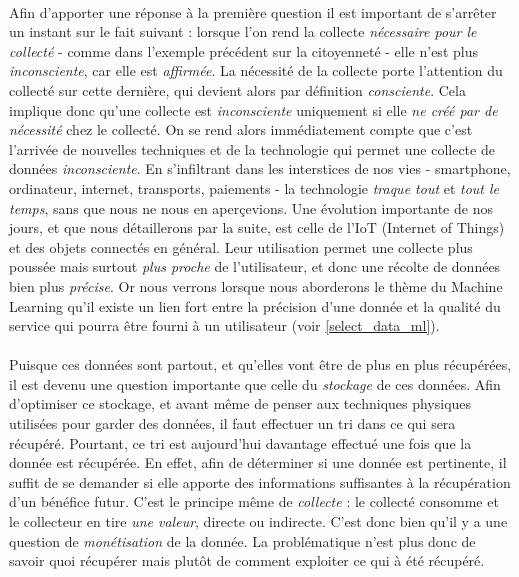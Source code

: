 \paragraph{} Afin d'apporter une réponse à la première question il est important de s'arrêter un instant sur le fait
suivant : lorsque l'on rend la collecte \emph{nécessaire pour le collecté} - comme dans l'exemple précédent sur la
citoyenneté - elle n'est plus \emph{inconsciente}, car elle est \emph{affirmée}. La nécessité de la collecte porte
l'attention du collecté sur cette dernière, qui devient alors par définition \emph{consciente}. Cela
implique donc qu'une collecte est \emph{inconsciente} uniquement si elle \emph{ne créé par de nécessité}
chez le collecté. On se rend alors immédiatement compte que c'est l'arrivée de nouvelles techniques et de la
technologie qui permet une collecte de données \emph{inconsciente}. En s'infiltrant dans les interstices de nos vies -
smartphone, ordinateur, internet, transports, paiements - la technologie \emph{traque tout} et \emph{tout le temps},
sans que nous ne nous en aperçevions. Une évolution importante de nos jours, et que nous détaillerons par la suite, est
celle de l'IoT (Internet of Things) et des objets connectés en général. Leur utilisation permet une collecte plus
poussée mais surtout \emph{plus proche} de l'utilisateur, et donc une récolte de données bien plus \emph{précise}. Or
nous verrons lorsque nous aborderons le thème du Machine Learning qu'il existe un lien fort entre la précision d'une
donnée et la qualité du service qui pourra être fourni à un utilisateur (voir \ref{select_data_ml}).

\paragraph{} Puisque ces données sont partout, et qu'elles vont être de plus en plus récupérées, il est devenu
une question importante que celle du \emph{stockage} de ces données. Afin d'optimiser ce stockage, et avant même de
penser aux techniques physiques utilisées pour garder des données, il faut effectuer un tri dans ce qui sera récupéré.
Pourtant, ce tri est aujourd'hui davantage effectué une fois que la donnée est récupérée. En effet, afin de déterminer
si une donnée est pertinente, il suffit de se demander si elle apporte des informations suffisantes à la récupération
d'un bénéfice futur. C'est le principe même de \emph{collecte} : le collecté consomme et le collecteur en tire \emph{
une valeur}, directe ou indirecte. C'est donc bien qu'il y a une question de \emph{monétisation} de la donnée. La
problématique n'est plus donc de savoir quoi récupérer mais plutôt de comment exploiter ce qui à été récupéré.

